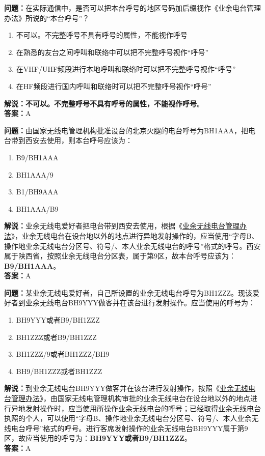 \textbf{问题：}在实际通信中，是否可以把本台呼号的地区号码加后缀视作《业余电台管理办法》所说的“本台呼号”？
\begin{enumerate}[label=\Alph*), leftmargin=1cm]
	\item 不可以。不完整呼号不具有呼号的属性，不能视作呼号
	\item 在熟悉的友台之间呼叫和联络中可以把不完整呼号视作“呼号”
	\item 在VHF/UHF频段进行本地呼叫和联络时可以把不完整呼号视作“呼号”
	\item 在HF频段进行国内呼叫和联络时可以把不完整呼号视作“呼号”
\end{enumerate}
\textbf{解说：不可以。不完整呼号不具有呼号的属性，不能视作呼号}。\\\textbf{答案：}A%

\textbf{问题：}由国家无线电管理机构批准设台的北京火腿的电台呼号为BH1AAA，把电台带到西安去使用，则本台呼号应该为：
\begin{enumerate}[label=\Alph*), leftmargin=1cm]
	\item B9/BH1AAA
	\item BH1AAA/9
	\item B1/BH9AAA
	\item BH1AAA/B9
\end{enumerate}
\textbf{解说：}业余无线电爱好者把电台带到西安去使用，根据《\href{https://www.miit.gov.cn/jgsj/zfs/bmgz/art/2020/art_147b69815b3641caad9047735f94c860.html}{业余无线电台管理办法}》，业余无线电台在设台地以外的地点进行异地发射操作的，应当使用“字母B、操作地业余无线电台分区号、符号/、本人业余无线电台的呼号”格式的呼号。西安属于陕西省，按照业余无线电台分区表，属于第9区，故本台呼号应该为：\textbf{B9/BH1AAA}。\\\textbf{答案：}A

\textbf{问题：}某业余无线电爱好者，自己所设置的业余无线电台呼号为BH1ZZZ。现该爱好者到业余无线电台BH9YYY做客并在该台进行发射操作。应当使用的呼号为：
\begin{enumerate}[label=\Alph*), leftmargin=1cm]
	\item BH9YYY或者B9/BH1ZZZ
	\item BH1ZZZ或者B9/BH1ZZZ
	\item BH1ZZZ/9或者BH1ZZZ/BH9
	\item BH9/BH1ZZZ或者BH1ZZZ
\end{enumerate}
\textbf{解说：}到业余无线电台BH9YYY做客并在该台进行发射操作，按照《\href{https://www.miit.gov.cn/jgsj/zfs/bmgz/art/2020/art_147b69815b3641caad9047735f94c860.html}{业余无线电台管理办法}》，由国家无线电管理机构审批的业余无线电台在设台地以外的地点进行异地发射操作时，应当使用所操作业余无线电台的呼号；已经取得业余无线电台执照的个人，可以使用“字母B、操作地业余无线电台分区号、符号/、本人业余无线电台呼号”格式的呼号。进行客席发射操作的业余无线电台BH9YYY属于第9区，故应当使用的呼号为：\textbf{BH9YYY或者B9/BH1ZZZ}。\\\textbf{答案：}A

